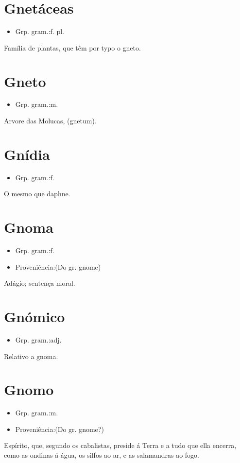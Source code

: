 \section{Gnetáceas}
\begin{itemize}
\item {Grp. gram.:f. pl.}
\end{itemize}
Família de plantas, que têm por typo o gneto.
\section{Gneto}
\begin{itemize}
\item {Grp. gram.:m.}
\end{itemize}
Arvore das Molucas, (\textunderscore gnetum\textunderscore ).
\section{Gnídia}
\begin{itemize}
\item {Grp. gram.:f.}
\end{itemize}
O mesmo que \textunderscore daphne\textunderscore .
\section{Gnoma}
\begin{itemize}
\item {Grp. gram.:f.}
\end{itemize}
\begin{itemize}
\item {Proveniência:(Do gr. \textunderscore gnome\textunderscore )}
\end{itemize}
Adágio; sentença moral.
\section{Gnómico}
\begin{itemize}
\item {Grp. gram.:adj.}
\end{itemize}
Relativo a gnoma.
\section{Gnomo}
\begin{itemize}
\item {Grp. gram.:m.}
\end{itemize}
\begin{itemize}
\item {Proveniência:(Do gr. \textunderscore gnome\textunderscore ?)}
\end{itemize}
Espírito, que, segundo os cabalistas, preside á Terra e a tudo que ella encerra, como as ondinas á água, os silfos ao ar, e as salamandras ao fogo.
